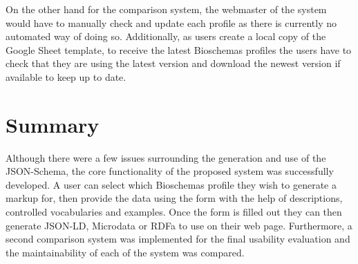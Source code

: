 On the other hand for the comparison system, the webmaster of the system would have to manually check and update each profile as there is currently no automated way of doing so. Additionally, as users create a local copy of the Google Sheet template, to receive the latest Bioschemas profiles the users have to check that they are using the latest version and download the newest version if available to keep up to date.


\section{Summary}
Although there were a few issues surrounding the generation and use of the JSON-Schema, the core functionality of the proposed system was successfully developed. A user can select which Bioschemas profile they wish to generate a markup for, then provide the data using the form with the help of descriptions, controlled vocabularies and examples. Once the form is filled out they can then generate JSON-LD, Microdata or RDFa to use on their web page. Furthermore, a second comparison system was implemented for the final usability evaluation and the maintainability of each of the system was compared.